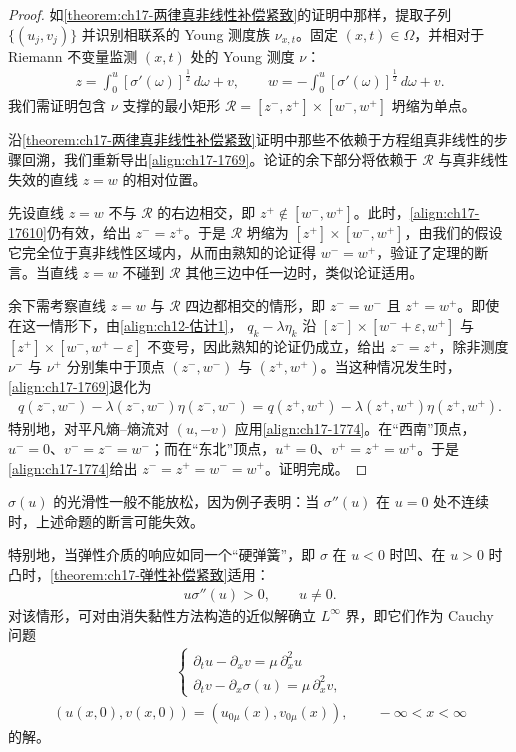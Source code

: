 \documentclass[../../main.tex]{subfiles}
\begin{document}
\begin{proof}
如\cref{theorem:ch17-两律真非线性补偿紧致}的证明中那样，提取子列 $\{(u_j,v_j)\}$ 并识别相联系的 Young 测度族 $\nu_{x,t}$。固定 $(x,t)\in\Omega$，并相对于 Riemann 不变量监测 $(x,t)$ 处的 Young 测度 $\nu$：
\begin{align}
z=\int_0^u[\sigma'(\omega)]^{\frac{1}{2}}\,d\omega+v,\qquad w=-\int_0^u[\sigma'(\omega)]^{\frac{1}{2}}\,d\omega+v.
\label{align:ch17-1773}
\end{align}
我们需证明包含 $\nu$ 支撑的最小矩形 $\mathscr{R}=[z^-,z^+]\times[w^-,w^+]$ 坍缩为单点。

沿\cref{theorem:ch17-两律真非线性补偿紧致}证明中那些不依赖于方程组真非线性的步骤回溯，我们重新导出\eqref{align:ch17-1769}。论证的余下部分将依赖于 $\mathscr{R}$ 与真非线性失效的直线 $z=w$ 的相对位置。

先设直线 $z=w$ 不与 $\mathscr{R}$ 的右边相交，即 $z^+\notin[w^-,w^+]$。此时，\eqref{align:ch17-17610}仍有效，给出 $z^-=z^+$。于是 $\mathscr{R}$ 坍缩为 $[z^+]\times[w^-,w^+]$，由我们的假设它完全位于真非线性区域内，从而由熟知的论证得 $w^-=w^+$，验证了定理的断言。当直线 $z=w$ 不碰到 $\mathscr{R}$ 其他三边中任一边时，类似论证适用。

余下需考察直线 $z=w$ 与 $\mathscr{R}$ 四边都相交的情形，即 $z^-=w^-$ 且 $z^+=w^+$。即使在这一情形下，由\eqref{align:ch12-估计1}，
$q_k-\lambda\eta_k$ 沿 $[z^-]\times[w^-+\varepsilon,w^+]$ 与 $[z^+]\times[w^-,w^+-\varepsilon]$ 不变号，因此熟知的论证仍成立，给出 $z^-=z^+$，除非测度 $\nu^-$ 与 $\nu^+$ 分别集中于顶点 $(z^-,w^-)$ 与 $(z^+,w^+)$。当这种情况发生时，\eqref{align:ch17-1769}退化为
\begin{align}
q(z^-,w^-)-\lambda(z^-,w^-)\eta(z^-,w^-)=q(z^+,w^+)-\lambda(z^+,w^+)\eta(z^+,w^+).
\label{align:ch17-1774}
\end{align}
特别地，对平凡熵--熵流对 $(u,-v)$ 应用\eqref{align:ch17-1774}。在“西南”顶点，$u^-=0$、$v^-=z^-=w^-$；而在“东北”顶点，$u^+=0$、$v^+=z^+=w^+$。于是\eqref{align:ch17-1774}给出 $z^-=z^+=w^-=w^+$。证明完成。
\end{proof}

$\sigma(u)$ 的光滑性一般不能放松，因为例子表明：当 $\sigma''(u)$ 在 $u=0$ 处不连续时，上述命题的断言可能失效。

特别地，当弹性介质的响应如同一个“硬弹簧”，即 $\sigma$ 在 $u<0$ 时凹、在 $u>0$ 时凸时，\cref{theorem:ch17-弹性补偿紧致}适用：
\begin{align}
u\sigma''(u)>0,\qquad u\neq0.
\label{align:ch17-1775}
\end{align}
对该情形，可对由消失黏性方法构造的近似解确立 $L^\infty$ 界，即它们作为 Cauchy 问题
\begin{align}
\begin{cases}
\partial_t u-\partial_x v=\mu\,\partial_x^2u\\
\partial_t v-\partial_x\sigma(u)=\mu\,\partial_x^2v,
\end{cases}
\label{align:ch17-1776}
\end{align}
\begin{align}
(u(x,0),v(x,0))=(u_{0\mu}(x),v_{0\mu}(x)),\qquad-\infty<x<\infty
\label{align:ch17-1777}
\end{align}
的解。
\end{document}
